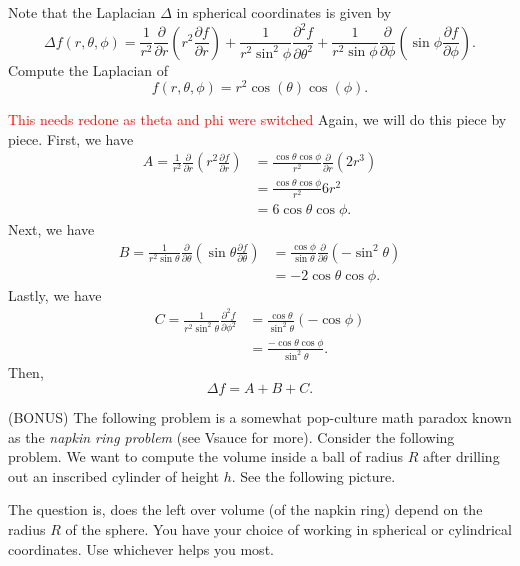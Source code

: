 \documentclass[12pt]{article} %
\begin{document}
\newpage
\begin{problem}
    Note that the Laplacian $\Delta$ in spherical coordinates is given by
    \[
        \Delta f(r,\theta,\phi) = \frac{1}{r^2} \frac{\partial}{\partial r} \left(r^2 \frac{\partial f}{\partial r}\right)+\frac{1}{r^2 \sin^2 \phi} \frac{\partial^2 f}{\partial \theta^2} + \frac{1}{r^2 \sin\phi}\frac{\partial}{\partial \phi} \left(\sin \phi \frac{\partial f}{\partial \phi}\right).
    \]
    Compute the Laplacian of
    \[
       f(r,\theta,\phi) = r^2 \cos(\theta)\cos(\phi).
    \]
\end{problem}
\begin{solution}
\textcolor{red}{This needs redone as theta and phi were switched}
 Again, we will do this piece by piece. First, we have
 \begin{align*}
    A=\frac{1}{r^2}\frac{\partial}{\partial r} \left(r^2 \frac{\partial f}{\partial r}\right)&= \frac{\cos \theta \cos \phi}{r^2}\frac{\partial}{\partial r} \left(2r^3\right) \\
    &= \frac{\cos \theta \cos\phi}{r^2} 6r^2\\
    &= 6 \cos \theta \cos \phi.
 \end{align*}
 Next, we have
 \begin{align*}
    B=\frac{1}{r^2 \sin \theta} \frac{\partial}{\partial \theta} \left(\sin \theta \frac{\partial f}{\partial \theta}\right) &= \frac{\cos \phi}{\sin \theta} \frac{\partial}{\partial \theta} \left( -\sin^2 \theta\right)\\
    &=-2\cos \theta \cos \phi.
 \end{align*}
 Lastly, we have
 \begin{align*}
    C=\frac{1}{r^2\sin^2 \theta} \frac{\partial^2 f}{\partial \phi^2}&= \frac{\cos \theta}{\sin^2 \theta} \left(-\cos \phi\right)\\
    &= \frac{-\cos \theta \cos \phi}{\sin^2 \theta}.
 \end{align*}
 Then,
 \[
 \Delta f = A+B+C.
 \]
\end{solution}

\newpage
\begin{problem} (BONUS)
The following problem is a somewhat pop-culture math paradox known as the \emph{napkin ring problem} (see Vsauce for more).  Consider the following problem.  We want to compute the volume inside a ball of radius $R$ after drilling out an inscribed cylinder of height $h$. See the following picture.
\begin{figure}[H]
	\centering
	\def\svgwidth{0.60\columnwidth}
	
\end{figure}
The question is, does the left over volume (of the napkin ring) depend on the radius $R$ of the sphere. You have your choice of working in spherical or cylindrical coordinates. Use whichever helps you most.
\end{problem}
\begin{solution}

\end{solution}
\end{document}
